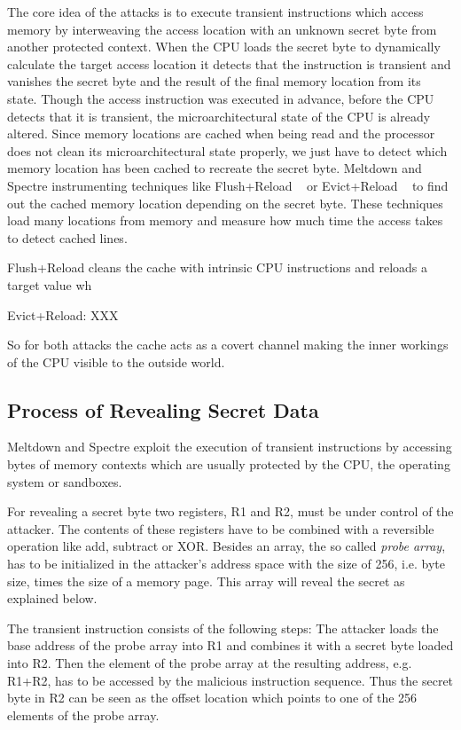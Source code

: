 \documentclass[a4paper,oneside,openright] {scrreprt}
\begin{document}
The core idea of the attacks is to execute transient instructions 
which access memory by interweaving the access location with an unknown secret byte from another protected context. 
When the CPU loads the secret byte to dynamically calculate the target access location 
it detects that the instruction is transient and vanishes the secret byte and the result of the final memory location from its state. 
Though the access instruction was executed in advance, before the CPU detects that it is transient, the microarchitectural state
 of the CPU is already altered.
 Since memory locations are cached when being read and the processor does not clean its microarchitectural state properly,
 we just have to detect which memory location has been cached to recreate the secret byte.
 Meltdown and Spectre instrumenting techniques like Flush+Reload ~\cite{yarom2014flush} 
 or Evict+Reload ~\cite{gruss2015cache} to find out the cached memory location depending on the secret byte.
These techniques load many locations from memory and measure how much time the access takes to detect cached lines.

Flush+Reload cleans the cache with intrinsic CPU instructions and reloads a target value wh 

Evict+Reload: XXX

 So for both attacks the cache acts as a covert channel making the inner workings of the CPU visible to the outside world.

\subsection{Process of Revealing Secret Data}
\label{ch:intro:motivation:A}

Meltdown and Spectre exploit the execution of transient instructions by accessing bytes of memory contexts 
 which are usually protected by the CPU, the operating system or sandboxes. 

For revealing a secret byte two registers, R1 and R2, must be under control of the attacker. The contents of these registers have to be 
combined with a reversible operation like add, subtract or XOR. Besides an array, the so called \textit{probe array}, has to be 
initialized in the attacker's address space with the size of 256, i.e. byte size, times the size of a memory page. This array will 
reveal the secret as explained below.

The transient instruction consists of the following steps:
The attacker loads the base address of the probe array into R1 and combines it with a secret byte loaded into R2. 
Then the element of the probe array at the resulting address, e.g. R1+R2, has to be accessed by the malicious instruction sequence.
Thus the secret byte in R2 can be seen as the offset location which points to one of the 256 elements of the probe array.
\end{document}
